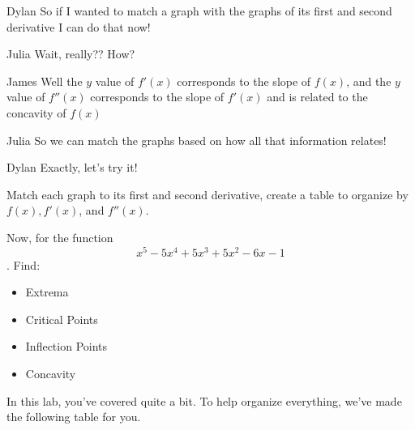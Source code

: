 \documentclass{ximera}
\begin{document}
\begin{dialogue}
\item[Dylan]So if I wanted to match a graph with the graphs of its first and second derivative I can do that now!
\item[Julia] Wait, really?? How?
\item[James] Well the $y$ value of $f'(x)$ corresponds to the slope of $f(x)$, and the $y$ value of $f''(x)$ corresponds to the slope of $f'(x)$ and is related to the concavity of $f(x)$
\item[Julia] So we can match the graphs based on how all that information relates!
\item[Dylan] Exactly, let's try it!
\end{dialogue}
Match each graph to its first and second derivative, create a table to organize by $f(x),f'(x)$, and $f''(x)$.

Now, for the function $$x^5-5x^4+5x^3+5x^2-6x-1$$. Find:
\begin{itemize}
\item{Extrema}
\item{Critical Points}
\item{Inflection Points}
\item{Concavity}
\end{itemize}


In this lab, you've covered quite a bit. To help organize everything, we've made the following table for you.
\end{document}
